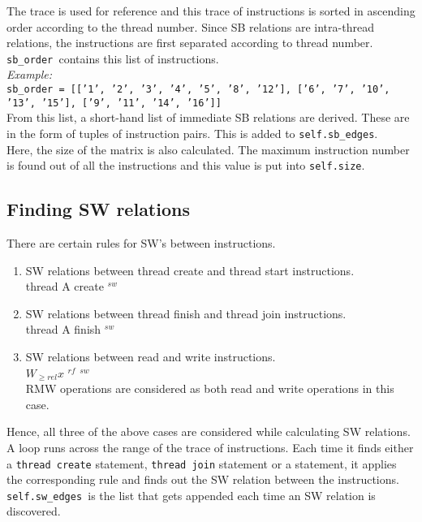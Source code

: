 \documentclass{article}
\newcommand{\var}[1]{\color{OliveGreen} \texttt{#1}\color{black}}
\newcommand{\varinfo}[1]{\scriptsize \texttt{#1} \normalsize}
\newcommand{\rf}[2]{{#1} {\color{Blue}\rightarrow$^{rf}$} \color{black}{#2}}
\newcommand{\sw}[2]{{#1} {\color{Blue}\rightarrow$^{sw}$} \color{black}{#2} }
\begin{document}
The trace is used for reference and this trace of instructions is sorted in ascending order according to the thread number. Since SB relations are intra-thread relations, the instructions are first separated according to thread number.\\
\var{sb\_order }contains this list of instructions.\\
\textit{Example:}\\
\var{sb\_order}\varinfo{ = [['1', '2', '3', '4', '5', '8', '12'], ['6', '7', '10', '13', '15'], ['9', '11', '14', '16']]}\\

From this list, a short-hand list of immediate SB relations are derived. These are in the form of tuples of instruction pairs. This is added to \var{self.sb\_edges}.\\

Here, the size of the matrix is also calculated. The maximum instruction number is found out of all the instructions and this value is put into \var{self.size}.

\subsection{Finding SW relations}
There are certain rules for SW's between instructions.
\begin{enumerate}
    \item SW relations between thread create and thread start instructions.\\
    \sw{thread A create}{thread A start}
    
    \item SW relations between thread finish and thread join instructions.\\
    \sw{thread A finish}{thread A join}
    
    \item SW relations between read and write instructions.\\
    \rf{$W_{\geq rel}x$}{$R_{\geq acq}x$} \implies \sw{$W_{\geq rel}x$}{$R_{\geq acq}x$}\\
    RMW operations are considered as both read and write operations in this case.
    
\end{enumerate}

Hence, all three of the above cases are considered while calculating SW relations. A loop runs across the range of the trace of instructions. Each time it finds either a \texttt{thread create} statement, \texttt{thread join} statement or a  statement, it applies the corresponding rule and finds out the SW relation between the instructions.\\
\var{self.sw\_edges }is the list that gets appended each time an SW relation is discovered.
\end{document}

